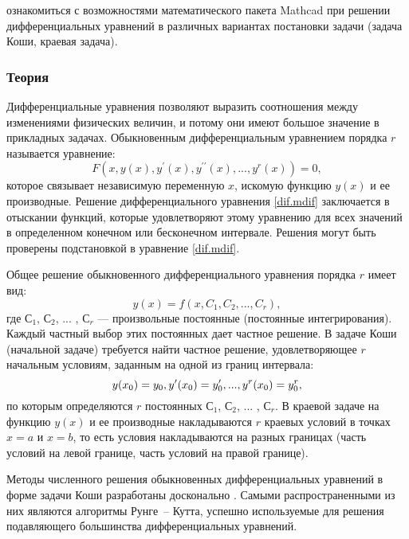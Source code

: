 
\goal ознакомиться с возможностями математического пакета Mathcad при решении дифференциальных уравнений в различных вариантах постановки задачи (задача Коши, краевая задача).

\subsubsection*{Теория}

Дифференциальные уравнения позволяют выразить соотношения между изменениями физических величин, и потому они имеют большое значение в прикладных задачах. Обыкновенным дифференциальным уравнением порядка $r$ называется уравнение:
\begin{equation} \label{dif.mdif}
F(x,y(x),y^\prime(x),y^{\prime \prime}(x), ... , y^r(x))=0,
\end{equation}
которое связывает независимую переменную $x$, искомую функцию $y(x)$ и ее производные. Решение дифференциального уравнения \ref{dif.mdif} заключается в отыскании функций, которые удовлетворяют этому уравнению для всех значений в определенном конечном или бесконечном интервале. Решения могут быть проверены подстановкой в уравнение \ref{dif.mdif}.

Общее решение обыкновенного дифференциального уравнения порядка $r$ имеет вид:
\begin{equation}
y(x)=f(x,C_1,C_2, ... ,C_r),
\end{equation}
где $С_1$, $С_2$, ... , $С_r$ --- произвольные постоянные (постоянные интегрирования). Каждый частный выбор этих постоянных дает частное решение. В задаче Коши (начальной задаче) требуется найти частное решение, удовлетворяющее $r$ начальным условиям, заданным на одной из границ интервала:
\begin{equation}
y(x_0)=y_0, \newline
y^{\prime}(x_0)=y_0^{\prime}, ... , y^{r}(x_0)=y^r_0,
\end{equation}
по которым определяются $r$ постоянных $С_1$, $С_2$, ... , $С_r$. В краевой задаче на функцию $y(x)$ и ее производные накладываются $r$ краевых условий в точках $x=a$ и $x=b$, то есть условия накладываются на разных границах (часть условий на левой границе, часть условий на правой границе).

Методы численного решения обыкновенных дифференциальных уравнений в форме задачи Коши разработаны досконально \cite{shipachevvs2005}. Самыми распространенными из них являются алгоритмы Рунге~-- Кутта, успешно используемые для решения подавляющего большинства дифференциальных уравнений. 

